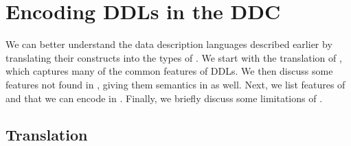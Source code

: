 \section{Encoding DDLs in the DDC}
\label{sec:encodings}

We can better understand the data description languages described
earlier by translating their constructs into the types of \ddc{}. We
start with the translation of \ipads{}, which captures many of the
common features of DDLs. We then discuss some features not found in
\ipads{}, giving them semantics in \ddc{} as well. Next, we list features
of \datascript{} and \packettypes{} that we can encode in \ddc{}.
Finally, we briefly discuss some limitations of \ddc{}.

\subsection{\ipads{} Translation}
\label{sec:trans-sl}

